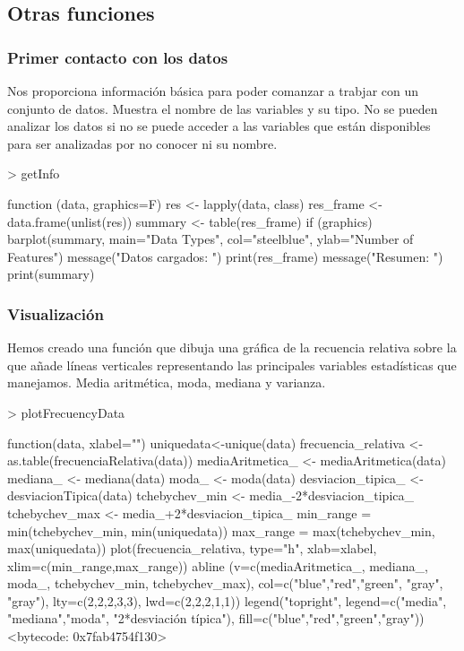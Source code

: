 \documentclass [a4paper] {article}
\begin{document}
\subsection{Otras funciones}
\subsubsection{Primer contacto con los datos}
Nos proporciona información básica para poder comanzar a trabjar con un conjunto de datos.
Muestra el nombre de las variables y su tipo.
No se pueden analizar los datos si no se puede acceder a las variables que están disponibles para ser analizadas por no conocer ni su nombre.
\begin{Schunk}
\begin{Sinput}
> getInfo
\end{Sinput}
\begin{Soutput}
function (data, graphics=F) {
  res <- lapply(data, class)
  res_frame <- data.frame(unlist(res))
  summary <- table(res_frame)
  if (graphics){
    barplot(summary, main="Data Types", col="steelblue", ylab="Number of Features")
  }
  message("Datos cargados: ")
  print(res_frame)
  message("Resumen: ")
  print(summary)
}
\end{Soutput}
\end{Schunk}
\subsubsection{Visualización}
Hemos creado una función que dibuja una gráfica de la recuencia relativa sobre la que añade líneas verticales 
representando las principales variables estadísticas que manejamos.
Media aritmética, moda, mediana y varianza.
\begin{Schunk}
\begin{Sinput}
> plotFrecuencyData
\end{Sinput}
\begin{Soutput}
function(data, xlabel="") {
  uniquedata<-unique(data)
  frecuencia_relativa <- as.table(frecuenciaRelativa(data))
  mediaAritmetica_ <- mediaAritmetica(data)
  mediana_ <- mediana(data)
  moda_ <- moda(data)
  desviacion_tipica_ <- desviacionTipica(data)
  tchebychev_min <- media_-2*desviacion_tipica_
  tchebychev_max <- media_+2*desviacion_tipica_
  min_range = min(tchebychev_min, min(uniquedata))
  max_range = max(tchebychev_min, max(uniquedata))
  plot(frecuencia_relativa, type="h", xlab=xlabel, xlim=c(min_range,max_range))
  abline (v=c(mediaAritmetica_, mediana_, moda_, tchebychev_min, tchebychev_max), 
          col=c("blue","red","green", "gray", "gray"), lty=c(2,2,2,3,3), lwd=c(2,2,2,1,1))
  legend("topright", legend=c("media", "mediana","moda", "2*desviación típica"), fill=c("blue","red","green","gray"))
}
<bytecode: 0x7fab4754f130>
\end{Soutput}
\end{Schunk}
\end{document}

